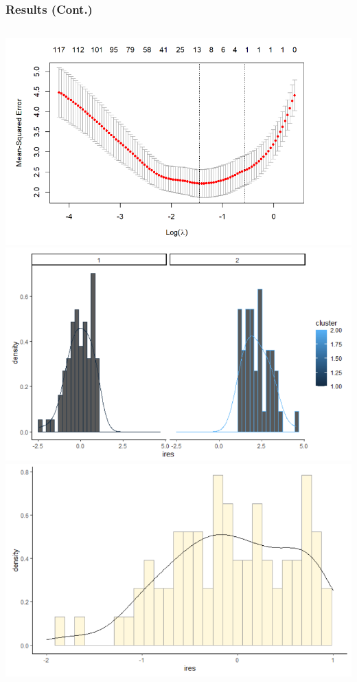 \documentclass[hyperref={pdfpagelabels=false}]{beamer}
\begin{document}
\begin{frame}
	\frametitle{Results (Cont.)}
		\begin{columns}[t]
			\centering
			\includegraphics[width = \textwidth]{fig/ChenCV.png}\\
			\includegraphics[width = \textwidth]{fig/ChenOnemode.png}
			\centering
			\includegraphics[width = \textwidth]{fig/ChenTwomode.png}\\

\end{columns}
\end{frame}
\end{document}
